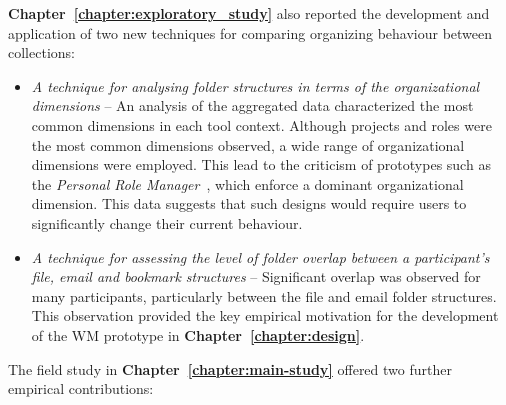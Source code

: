 %
\textbf{Chapter~\ref{chapter:exploratory_study}} also reported the development and application of two new techniques for comparing organizing behaviour between collections:

\begin{itemize}

\item \textit{A technique for analysing folder structures in terms of the organizational dimensions} -- An analysis of the aggregated data characterized the most common dimensions in each tool context.  Although projects and roles were the most common dimensions observed, a wide range of organizational dimensions were employed.  This lead to the criticism of prototypes such as the \textit{Personal Role Manager}~\citep{Shneiderman:94}, which enforce a dominant organizational dimension. This data suggests that such designs would require users to significantly change their current behaviour.

\item \textit{A technique for assessing the level of \textit{folder overlap} between a participant's file, email and bookmark structures} --  Significant overlap was observed for many participants, particularly between the file and email folder structures.  This observation provided the key empirical motivation for the development of the WM prototype in \textbf{Chapter~\ref{chapter:design}}.  %

\end{itemize}


The field study in \textbf{Chapter~\ref{chapter:main-study}} offered two further empirical contributions:


